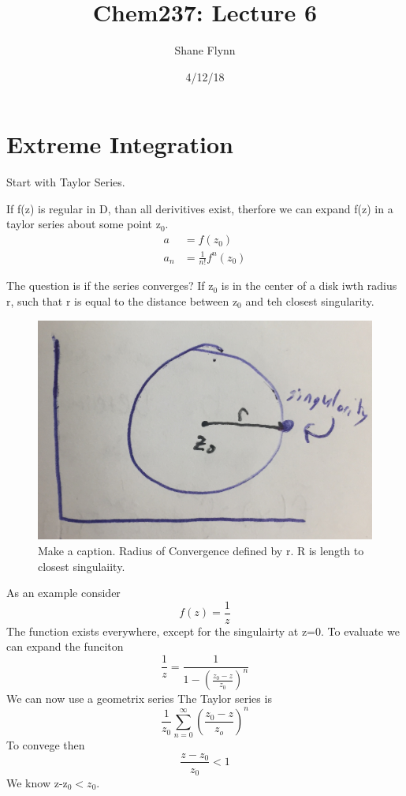 \documentclass{article}
\title{Chem237: Lecture 6}
\date{4/12/18}
\author{Shane Flynn}
\newcommand{\be}{\begin{equation}}
\newcommand{\ee}{\end{equation}}
\begin{document}
\maketitle
\section*{Extreme Integration}
Start with Taylor Series.

If f(z) is regular in D, than all derivitives exist, therfore we can expand f(z) in a taylor series about some point z$_0$. 
\be
\begin{split}
    a &= f(z_0)\\
    a_n &= \frac{1}{n!} f^n(z_0)
\end{split}
\ee

The question is if the series converges?
If z$_0$ is in the center of a disk iwth radius r, such that r is equal to the distance between z$_0$ and teh closest singularity. 

\begin{figure}[H]
  \centering
    \includegraphics[scale=0.2]{Figures/converge.png}
    \caption{Make a caption. Radius of Convergence defined by r. R is length to closest singulaiity.}
\end{figure}

As an example consider 
\be
f(z) = \frac{1}{z}
\ee
The function exists everywhere, except for the singulairty at z=0. 
To evaluate we can expand the funciton
\be
\frac{1}{z} = \frac{1}{1-\left(\frac{z_0-z}{z_0}\right)^n}
\ee
We can now use a geometrix series
The Taylor series is
\be
\frac{1}{z_0} \sum_{n=0}^\infty \left(\frac{z_0-z}{z_o}\right)^n
\ee
To convege then 
\be
\frac{z-z_0}{z_0}< 1
\ee
We know z-z$_0 < z_0$. 
\end{document}
